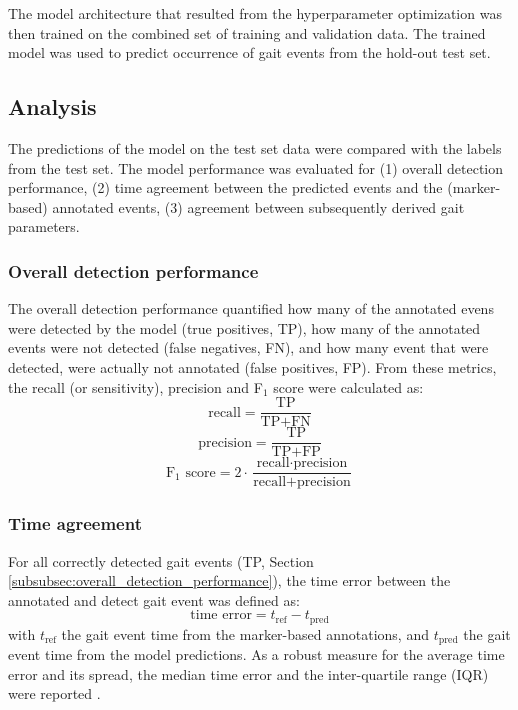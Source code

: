 \documentclass[sensors,article,submit,pdftex,moreauthors]{Definitions/mdpi}
\begin{document}
The model architecture that resulted from the hyperparameter optimization was then trained on the combined set of training and validation data. The trained model was used to predict occurrence of gait events from the hold-out test set.

\subsection{Analysis}
The predictions of the model on the test set data were compared with the labels from the test set. The model performance was evaluated for (1) overall detection performance, (2) time agreement between the predicted events and the (marker-based) annotated events, (3) agreement between subsequently derived gait parameters.
\subsubsection{Overall detection performance \label{subsubsec:overall_detection_performance}}
The overall detection performance quantified how many of the annotated evens were detected by the model (true positives, TP), how many of the annotated events were not detected (false negatives, FN), and how many event that were detected, were actually not annotated (false positives, FP). From these metrics, the recall (or sensitivity), precision and F$_{1}$ score were calculated as:
\begin{equation}
	\textrm{recall} = \frac{\textrm{TP}}{\textrm{TP} + \textrm{FN}} \nonumber
	\label{eqn:recall}
\end{equation}
\begin{equation}
	\textrm{precision} = \frac{\textrm{TP}}{\textrm{TP} + \textrm{FP}} \nonumber
	\label{eqn:precision}
\end{equation}
\begin{equation}
	\textrm{F$_{1}$ score} = 2 \cdot \frac{\textrm{recall} \cdot \textrm{precision}}{\textrm{recall} + \textrm{precision}}  \nonumber
	\label{eqn:f1_score}
\end{equation}

\subsubsection{Time agreement}
For all correctly detected gait events (TP, Section \ref{subsubsec:overall_detection_performance}), the time error between the annotated and detect gait event was defined as:
\begin{equation}
	\textrm{time error} = t_{\textrm{ref}} - t_{\textrm{pred}}
	\label{eqn:time_agreement}
\end{equation}
with $t_{\mathrm{ref}}$ the gait event time from the marker-based annotations, and $t_{\mathrm{pred}}$ the gait event time from the model predictions. As a robust measure for the average time error and its spread, the median time error and the inter-quartile range (IQR) were reported \cite{OpenIntro2019}.
\end{document}
